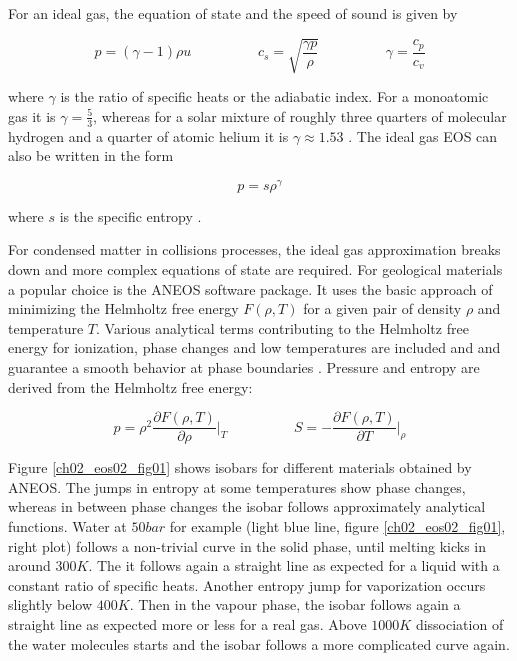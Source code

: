 For an ideal gas, the equation of state and the speed of sound is given by

\begin{equation}
\label{ch02_sph01_eq036}
p = ( \gamma - 1 ) \rho u \hspace{2cm} c_s = \sqrt{ \frac{\gamma p}{\rho} } \hspace{2cm} \gamma = \frac{c_p}{c_v}
\end{equation}

where $\gamma$ is the ratio of specific heats or the adiabatic index. For a monoatomic gas it is $\gamma = \frac{5}{3}$, whereas for a solar mixture of roughly three quarters of molecular hydrogen and a quarter of atomic helium it is $\gamma \approx 1.53$ \citep{Nelson:2000p75}. The ideal gas EOS can also be written in the form 

\begin{equation}
p = s \rho^{\gamma}
\end{equation}

where $s$ is the specific entropy \citep{Springel:2005p51}.

For condensed matter in collisions processes, the ideal gas approximation breaks down and more complex equations of state are required. For geological materials a popular choice is the ANEOS software package. It uses the basic approach of minimizing the Helmholtz free energy $F(\rho, T)$ for a given pair of density $\rho$ and temperature $T$. Various analytical terms contributing to the Helmholtz free energy for ionization, phase changes and low temperatures are included and and guarantee a smooth behavior at phase boundaries \citep{Thompson:1990p1103}. Pressure and entropy are derived from the Helmholtz free energy:

\begin{equation}
\label{ch02_sph01_eq037}
p = \rho^2 \frac{\partial F(\rho, T)}{\partial \rho} \Big|_{T} \hspace{2cm} S = - \frac{\partial F(\rho, T)}{\partial T} \Big|_{\rho}
\end{equation}

Figure \ref{ch02_eos02_fig01} shows isobars for different materials obtained by ANEOS. The jumps in entropy at some temperatures show phase changes, whereas in between phase changes the isobar follows approximately analytical functions. Water at $50bar$ for example (light blue line, figure \ref{ch02_eos02_fig01}, right plot) follows a non-trivial curve in the solid phase, until melting kicks in around $300K$. The it follows again a straight line as expected for a liquid with a constant ratio of specific heats. Another entropy jump for vaporization occurs slightly below $400K$. Then in the vapour phase, the isobar follows again a straight line as expected more or less for a real gas. Above $1000K$ dissociation of the water molecules starts and the isobar follows a more complicated curve again.

